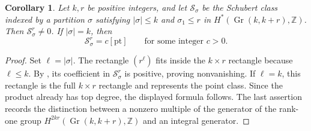 \documentclass[10pt,a4paper]{amsart}
\newtheorem{corollary}{Corollary}
\DeclareMathOperator{\Gr}{Gr}
\begin{document}
\begin{corollary}\label{cor: Schubert corrected}
Let $k,r$ be positive integers, and let $\mathcal S_\sigma$ be the Schubert
class indexed by a partition $\sigma$ satisfying $|\sigma|\leq k$ and
$\sigma_1\leq r$ in $H^*(\Gr(k,k+r),\mathbb Z)$.  Then
$\mathcal S_\sigma^r\neq0$.  If $|\sigma|=k$, then
\[
\mathcal S_\sigma^r=c[\mathrm{pt}]
\qquad\text{for some integer }c>0.
\]
\end{corollary}

\begin{proof}
Set $\ell=|\sigma|$.  The rectangle $(r^\ell)$ fits inside the $k\times r$
rectangle because $\ell\leq k$.  By , its
coefficient in $\mathcal S_\sigma^r$ is positive, proving nonvanishing.  If
$\ell=k$, this rectangle is the full $k\times r$ rectangle and represents the
point class.  Since the product already has top degree, the displayed formula
follows.  The last assertion records the distinction between a nonzero
multiple of the generator of the rank-one group
$H^{2kr}(\Gr(k,k+r),\mathbb Z)$ and an integral generator.
\end{proof}
\end{document}
